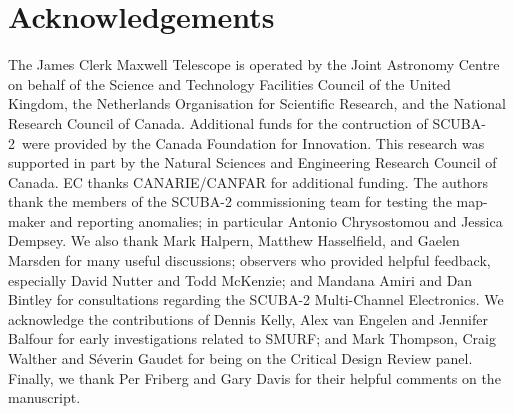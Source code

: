 \documentclass[useAMS,usenatbib,nofootinbib]{mn2e}
\newcommand{\scuba}{SCUBA-2}
\begin{document}
\section{Acknowledgements}

The James Clerk Maxwell Telescope is operated by the Joint Astronomy
Centre on behalf of the Science and Technology Facilities Council of
the United Kingdom, the Netherlands Organisation for Scientific
Research, and the National Research Council of Canada. Additional
funds for the contruction of \scuba\ were provided by the Canada
Foundation for Innovation.  This research was supported in part by the
Natural Sciences and Engineering Research Council of Canada.  EC
thanks CANARIE/CANFAR for additional funding.  The authors thank the
members of the SCUBA-2 commissioning team for testing the map-maker
and reporting anomalies; in particular Antonio Chrysostomou and
Jessica Dempsey.  We also thank Mark Halpern, Matthew Hasselfield, and
Gaelen Marsden for many useful discussions; observers who provided
helpful feedback, especially David Nutter and Todd McKenzie; and
Mandana Amiri and Dan Bintley for consultations regarding the SCUBA-2
Multi-Channel Electronics.  We acknowledge the contributions of Dennis
Kelly, Alex van Engelen and Jennifer Balfour for early investigations
related to SMURF; and Mark Thompson, Craig Walther and S\'{e}verin
Gaudet for being on the Critical Design Review panel. Finally, we
thank Per Friberg and Gary Davis for their helpful comments on the
manuscript.




\end{document}
